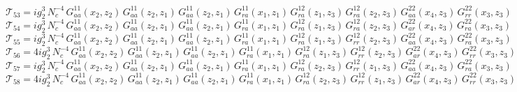 \documentclass{article}
\begin{document}
\begin{equation*}
\mathcal{T}_{53} = i g_{2}^{3}\,N_c^{-4}\,G^{11}_{aa}\left(x_2,z_{2}\right) \, G^{11}_{aa}\left(z_{2},z_{1}\right) \, G^{11}_{aa}\left(z_{2},z_{1}\right) \, G^{11}_{ra}\left(x_1,z_{1}\right) \, G^{12}_{ra}\left(z_{1},z_{3}\right) \, G^{12}_{ra}\left(z_{2},z_{3}\right) \, G^{22}_{aa}\left(x_4,z_{3}\right) \, G^{22}_{rr}\left(x_3,z_{3}\right)
\end{equation*}
\begin{equation*}
\mathcal{T}_{54} = i g_{2}^{3}\,N_c^{-4}\,G^{11}_{aa}\left(x_2,z_{2}\right) \, G^{11}_{aa}\left(z_{2},z_{1}\right) \, G^{11}_{aa}\left(z_{2},z_{1}\right) \, G^{11}_{ra}\left(x_1,z_{1}\right) \, G^{12}_{ra}\left(z_{1},z_{3}\right) \, G^{12}_{ra}\left(z_{2},z_{3}\right) \, G^{22}_{ar}\left(x_4,z_{3}\right) \, G^{22}_{ra}\left(x_3,z_{3}\right)
\end{equation*}
\begin{equation*}
\mathcal{T}_{55} = i g_{2}^{3}\,N_c^{-4}\,G^{11}_{aa}\left(x_2,z_{2}\right) \, G^{11}_{aa}\left(z_{2},z_{1}\right) \, G^{11}_{aa}\left(z_{2},z_{1}\right) \, G^{11}_{ra}\left(x_1,z_{1}\right) \, G^{12}_{ra}\left(z_{1},z_{3}\right) \, G^{12}_{rr}\left(z_{2},z_{3}\right) \, G^{22}_{aa}\left(x_4,z_{3}\right) \, G^{22}_{ra}\left(x_3,z_{3}\right)
\end{equation*}
\begin{equation*}
\mathcal{T}_{56} = 4 i g_{2}^{3}\,N_c^{-4}\,G^{11}_{aa}\left(x_2,z_{2}\right) \, G^{11}_{aa}\left(z_{2},z_{1}\right) \, G^{11}_{aa}\left(z_{2},z_{1}\right) \, G^{11}_{ra}\left(x_1,z_{1}\right) \, G^{12}_{ra}\left(z_{1},z_{3}\right) \, G^{12}_{rr}\left(z_{2},z_{3}\right) \, G^{22}_{ar}\left(x_4,z_{3}\right) \, G^{22}_{rr}\left(x_3,z_{3}\right)
\end{equation*}
\begin{equation*}
\mathcal{T}_{57} = i g_{2}^{3}\,N_c^{-4}\,G^{11}_{aa}\left(x_2,z_{2}\right) \, G^{11}_{aa}\left(z_{2},z_{1}\right) \, G^{11}_{aa}\left(z_{2},z_{1}\right) \, G^{11}_{ra}\left(x_1,z_{1}\right) \, G^{12}_{ra}\left(z_{2},z_{3}\right) \, G^{12}_{rr}\left(z_{1},z_{3}\right) \, G^{22}_{aa}\left(x_4,z_{3}\right) \, G^{22}_{ra}\left(x_3,z_{3}\right)
\end{equation*}
\begin{equation*}
\mathcal{T}_{58} = 4 i g_{2}^{3}\,N_c^{-4}\,G^{11}_{aa}\left(x_2,z_{2}\right) \, G^{11}_{aa}\left(z_{2},z_{1}\right) \, G^{11}_{aa}\left(z_{2},z_{1}\right) \, G^{11}_{ra}\left(x_1,z_{1}\right) \, G^{12}_{ra}\left(z_{2},z_{3}\right) \, G^{12}_{rr}\left(z_{1},z_{3}\right) \, G^{22}_{ar}\left(x_4,z_{3}\right) \, G^{22}_{rr}\left(x_3,z_{3}\right)
\end{equation*}
\end{document}
